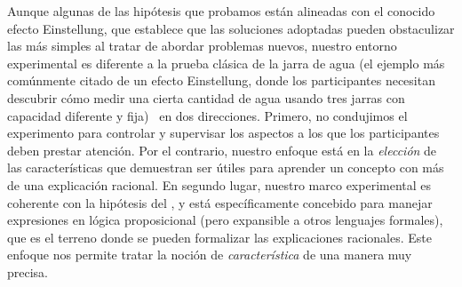 Aunque algunas de las hipótesis que probamos están alineadas con el conocido efecto Einstellung, que establece que las soluciones adoptadas pueden obstaculizar las más simples al tratar de abordar problemas nuevos, nuestro entorno experimental es diferente a la prueba clásica de la jarra de agua (el ejemplo más comúnmente citado de un efecto Einstellung, donde los participantes necesitan descubrir cómo medir una cierta cantidad de agua usando tres jarras con capacidad diferente y fija)~\cite{luchins1942mechanization} en dos direcciones. Primero, no condujimos el experimento para controlar y supervisar los aspectos a los que los participantes deben prestar atención. Por el contrario, nuestro enfoque está en la {\em elección} de las características que demuestran ser útiles para aprender un concepto con más de una explicación racional. En segundo lugar, nuestro marco experimental es coherente con la hipótesis del \lot, y está específicamente concebido para manejar expresiones en lógica proposicional (pero expansible a otros lenguajes formales), que es el terreno donde se pueden formalizar las explicaciones racionales. Este enfoque nos permite tratar la noción de {\em característica} de una manera muy precisa.


